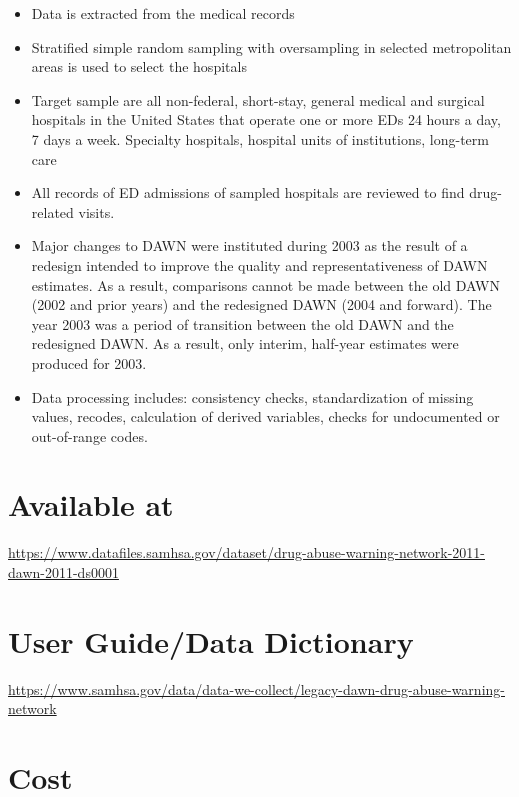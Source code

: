\documentclass[
]{book}
\providecommand{\tightlist}{%
  \setlength{\itemsep}{0pt}\setlength{\parskip}{0pt}}
\begin{document}
\begin{itemize}
\tightlist
\item
  Data is extracted from the medical records
\item
  Stratified simple random sampling with oversampling in selected metropolitan areas is used to select the hospitals
\item
  Target sample are all non-federal, short-stay, general medical and surgical hospitals in the United States that operate one or more EDs 24 hours a day, 7 days a week. Specialty hospitals, hospital units of institutions, long-term care
\item
  All records of ED admissions of sampled hospitals are reviewed to find drug-related visits.
\item
  Major changes to DAWN were instituted during 2003 as the result of a redesign intended to improve the quality and representativeness of DAWN estimates. As a result, comparisons cannot be made between the old DAWN (2002 and prior years) and the redesigned DAWN (2004 and forward). The year 2003 was a period of transition between the old DAWN and the redesigned DAWN. As a result, only interim, half-year estimates were produced for 2003.
\item
  Data processing includes: consistency checks, standardization of missing values, recodes, calculation of derived variables, checks for undocumented or out-of-range codes.
\end{itemize}

\hypertarget{available-at-23}{%
\section{Available at}\label{available-at-23}}

\url{https://www.datafiles.samhsa.gov/dataset/drug-abuse-warning-network-2011-dawn-2011-ds0001}

\hypertarget{user-guidedata-dictionary-23}{%
\section{User Guide/Data Dictionary}\label{user-guidedata-dictionary-23}}

\url{https://www.samhsa.gov/data/data-we-collect/legacy-dawn-drug-abuse-warning-network}

\hypertarget{cost-23}{%
\section{Cost}\label{cost-23}}
\end{document}
